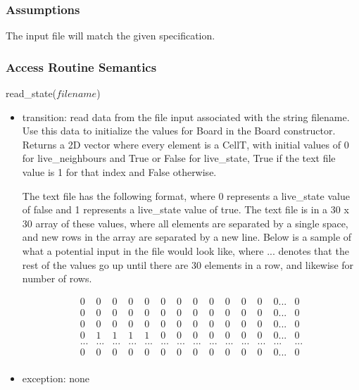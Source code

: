 \documentclass[12pt]{article}
\begin{document}
\subsubsection* {Assumptions}

The input file will match the given specification.

\subsubsection* {Access Routine Semantics}

\noindent read\_state($filename$)
\begin{itemize}
\item transition: read data from the file input associated with the string filename.
  Use this data to initialize the values for Board in the Board constructor. Returns a 2D vector where every element is a CellT, with initial values of 0 for live\_neighbours and True or False for live\_state, True if the text file value is 1 for that index and False otherwise.

  The text file has the following format, where 0 represents a live\_state value of false and 1 represents a live\_state value of true. The text file is in a 30 x 30 array of these values, where all elements are separated by a single space, and new rows in the array are separated by a new line. Below is a sample of what a potential input in the file would look like, where ... denotes that the rest of the values go up until there are 30 elements in a row, and likewise for number of rows.

  \begin{equation}
    \begin{array}{cccccccccccccc}
      0 & 0 & 0 & 0 & 0 & 0 & 0 & 0 & 0 & 0 & 0 & 0 & 0 ... & 0 \\ 
      0 & 0 & 0 & 0 & 0 & 0 & 0 & 0 & 0 & 0 & 0 & 0 & 0 ... & 0 \\
      0 & 0 & 0 & 0 & 0 & 0 & 0 & 0 & 0 & 0 & 0 & 0 & 0 ... & 0 \\
      0 & 1 & 1 & 1 & 1 & 0 & 0 & 0 & 0 & 0 & 0 & 0 & 0 ... & 0 \\
      ... & ... & ... & ... & ... & ... & ... & ... & ... & ... & ... & ... & ... & ... \\
      0 & 0 & 0 & 0 & 0 & 0 & 0 & 0 & 0 & 0 & 0 & 0 & 0 ... & 0 \\
    \end{array}
  \end{equation}

\item exception: none
\end{itemize}
\end{document}
